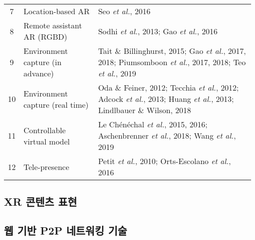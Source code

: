 \begin{sidewaystable}
\begin{tabularx}{\textwidth}{cp{}X}
7     & Location-based AR                       & Seo \textit{et al.}, 2016\cite{Seo2016Webizing}      \\
8     & Remote assistant AR (RGBD)              & Sodhi \textit{et al.}, 2013\cite{Sodhi2013BeThere}; Gao \textit{et al.}, 2016\cite{Gao2016Oriented}      \\
9     & Environment capture (in advance)        & Tait \& Billinghurst, 2015\cite{Tait2015Effect}; Gao \textit{et al.}, 2017, 2018\cite{Tait2015Effect,Gao2018Real}; Piumsomboon \textit{et al.}, 2017, 2018\cite{Piumsomboon2017Exploring,Piumsomboon2018MiniMe}; Teo \textit{et al.}, 2019\cite{Teo2019Mixed}     \\
10    & Environment capture (real time)         & Oda \& Feiner, 2012\cite{Piumsomboon2018MiniMe}; Tecchia \textit{et al.}, 2012\cite{Tecchia20123D}; Adcock \textit{et al.}, 2013\cite{Adcock2013RemoteFusion}; Huang \textit{et al.}, 2013\cite{Huang2013HandsIn3D}; Lindlbauer \& Wilson, 2018\cite{Lindlbauer2018Remixed}      \\
11    & Controllable virtual model              & Le Chénéchal \textit{et al.}, 2015, 2016\cite{Chenechal2015Stretchable,Chenechal2015Stretchable}; Aschenbrenner \textit{et al.}, 2018\cite{Aschenbrenner2018Exploration}; Wang \textit{et al.}, 2019\cite{Wang2019aMR}     \\
12    & Tele-presence                           & Petit \textit{et al.}, 2010\cite{Petit2010Multicamera}; Orts-Escolano \textit{et al.}, 2016\cite{Orts2016Holoportation}     \\ \hline
\end{tabularx}
\end{sidewaystable}

\subsection{XR 콘텐츠 표현}

\subsection{웹 기반 P2P 네트워킹 기술} 